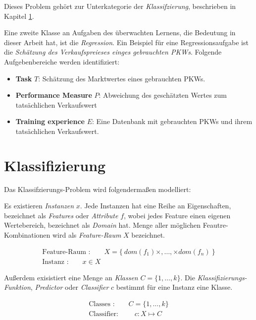 Dieses Problem gehört zur Unterkategorie der \emph{Klassifzierung}, beschrieben in Kapitel \ref{sec:classification}. 

Eine zweite Klasse an Aufgaben des überwachten Lernens, die  Bedeutung in dieser Arbeit hat, ist die \emph{Regression}. Ein Beispiel für eine Regressionsaufgabe ist die \emph{Schätzung des Verkaufspreieses einges gebrauchten PKWs}. Folgende Aufgebenbereiche werden identifiziert:

\begin{itemize}
	\item \textbf{Task} $T$: Schätzung des Marktwertes eines gebrauchten PKWs. 
	\item \textbf{Performance Measure} $P$: Abweichung des geschätzten Wertes zum tatsächlichen Verkaufswert
	\item \textbf{Training experience} $E$: Eine Datenbank mit gebrauchten PKWs und ihrem tatsächlichen Verkaufswert.
\end{itemize}

\section{Klassifizierung}
\label{sec:classification}

Das Klassifzierungs-Problem wird folgendermaßen modelliert: 

Es existieren \emph{Instanzen} $x$. Jede Instanzen hat eine Reihe an Eigenschaften, bezeichnet als \emph{Features} oder \emph{Attribute} $f$, wobei jedes Feature einen eigenen Wertebereich, bezeichnet als \emph{Domain} hat. Menge aller möglichen Feautre-Kombinationen wird als \emph{Feature-Raum} $X$ bezeichnet.  

\begin{equation}
\begin{gathered}
\text{Feature-Raum :} \qquad X = \{\  dom(f_1) \times , \ldots, \times dom(f_n)\ \} \\
\text{Instanz :} \qquad  x \in X 
\end{gathered}
\end{equation}

Außerdem exisistiert eine Menge an \emph{Klassen} $C = \{1, \ldots , k\}$. Die \emph{Klassifizierungs-Funktion}, \emph{Predictor}  oder \emph{Classifier} $c$ bestimmt für eine Instanz eine Klasse.

\begin{equation}
\begin{gathered}
\text{Classes :} \qquad C = \{ 1 , \ldots , k \} \\
\text{Classifier: } \qquad  c: X \mapsto C
\end{gathered}
\end{equation}

